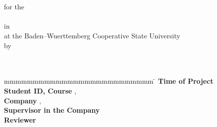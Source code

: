 \begin{titlepage}
	\enlargethispage{20mm}
	\begin{center}
	  \vspace*{12mm}	{\LARGE\bf \titel }\\
	  \vspace*{12mm}	{\large\bf \arbeit}\\
	  \vspace*{12mm}	for the\\
	  \vspace*{3mm} 	{\bf \abschluss}\\
	  \vspace*{12mm}	in \studiengang\\
	  \vspace*{3mm} 	at the Baden--Wuerttemberg Cooperative State University \dhbw\\
	  \vspace*{12mm}	by\\
	  \vspace*{3mm} 	{\large\bf \autor}\\
	  \vspace*{12mm}	\datumAbgabe\\
	\end{center}
	\vfill
	\begin{spacing}{1.2}
	\begin{tabbing}
		mmmmmmmmmmmmmmmmmmmmmmmmmm     \= \kill
		\textbf{Time of Project}  \>  \zeitraum\\
		\textbf{Student ID, Course}  \>  \matrikelnr, \kurs\\
		\textbf{Company}      \>  \firma, \firmenort\\
		\textbf{Supervisor in the Company}              \>  \betreuer\\
		\textbf{Reviewer}             \>  \gutachter
	\end{tabbing}
	\end{spacing}
\end{titlepage}
